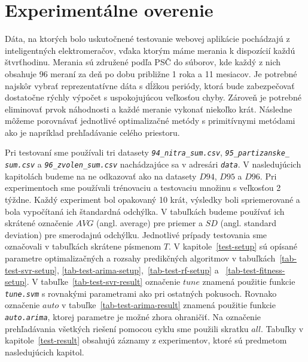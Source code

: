 \documentclass[a4paper,slovak,12pt,appendix]{article}
\begin{document}

\newpage
\section{Experimentálne overenie}
\label{evaluation}
Dáta, na ktorých bolo uskutočnené testovanie webovej aplikácie pochádzajú
z inteligentných elektromeračov, vďaka ktorým máme merania k dispozícií každú
štvrťhodinu. Merania sú združené podľa PSČ do súborov, kde každý z nich obsahuje
96 meraní za deň po dobu približne 1 roka a 11 mesiacov. Je potrebné najskôr
vybrať reprezentatívne dáta s dĺžkou periódy, ktorá bude zabezpečovať dostatočne
rýchly výpočet s uspokojujúcou veľkosťou chyby. Zároveň je potrebné eliminovať
prvok náhodnosti a každé meranie vykonať niekoľko krát. Následne môžeme
porovnávať jednotlivé optimalizačné metódy s primitívnymi metódami ako je napríklad
prehľadávanie celého priestoru.

Pri testovaní sme používali tri datasety \texttt{\textit{94\_nitra\_sum.csv}},
\texttt{\textit{95\_partizanske\_}} \texttt{\textit{sum.csv}} a \texttt{\textit{96\_zvolen\_sum.csv}}
nachádzajúce sa v adresári \texttt{\textit{data}}. V nasledujúcich kapitolách
budeme na ne odkazovať ako na datasety $D94$,
$D95$ a $D96$. Pri experimentoch sme používali
trénovaciu a testovaciu množinu s veľkosťou 2 týždne. Každý experiment bol
opakovaný 10 krát, výsledky boli spriemerované a bola vypočítaná ich
štandardná odchýlka. V tabuľkách budeme používať ich skrátené označenie
$AVG$ (angl. average) pre priemer a $SD$ (angl. standard deviation) pre
smerodajnú odchýlku. Jednotlivé prípady testovania sme označovali v tabuľkách
skrátene písmenom $T$. V kapitole~\ref{test-setup} sú opísané parametre
optimalizačných a rozsahy predikčných algoritmov v tabuľkách~\ref{tab-test-svr-setup},
\ref{tab-test-arima-setup},~\ref{tab-test-rf-setup} a ~\ref{tab-test-fitness-setup}.
V tabuľke~\ref{tab-test-svr-result} označenie $tune$ znamená použitie funkcie
\texttt{\textit{tune.svm}} s rovnakými parametrami ako pri ostatných pokusoch.
Rovnako označenie $auto$ v tabuľke~\ref{tab-test-arima-result} znamená použitie
funkcie \texttt{\textit{auto.arima}}, ktorej parametre je možné zhora ohraničiť.
Na označenie prehľadávania všetkých riešení pomocou cyklu sme použili skratku $all$.
Tabuľky v kapitole~\ref{test-result} obsahujú záznamy z experimentov, ktoré sú
predmetom nasledujúcich kapitol.
\end{document}
